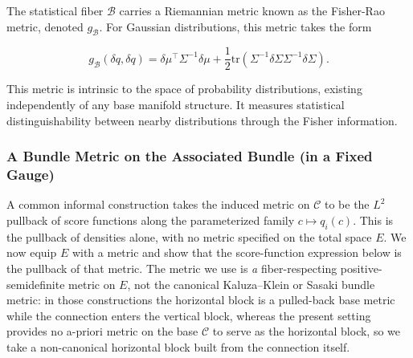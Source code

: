 \documentclass[11pt]{article}
\begin{document}
The statistical fiber $\mathcal{B}$ carries a Riemannian metric known as the Fisher-Rao metric, denoted $g_{\mathcal{B}}$. For Gaussian distributions, this metric takes the form

\begin{equation}
g_{\mathcal{B}}(\delta q, \delta q) = \delta\mu^\top \Sigma^{-1} \delta\mu + \frac{1}{2}\mathrm{tr}(\Sigma^{-1}\delta\Sigma\Sigma^{-1}\delta\Sigma).
\end{equation}

This metric is intrinsic to the space of probability distributions, existing independently of any base manifold structure. It measures statistical distinguishability between nearby distributions through the Fisher information.

\subsubsection{A Bundle Metric on the Associated Bundle (in a Fixed Gauge)}

A common informal construction takes the induced metric on $\mathcal{C}$ to be the $L^2$ pullback of score functions along the parameterized family $c \mapsto q_i(c)$. This is the pullback of densities alone, with no metric specified on the total space $E$. We now equip $E$ with a metric and show that the score-function expression below is the pullback of that metric. The metric we use is \emph{a} fiber-respecting positive-semidefinite metric on $E$, not the canonical Kaluza--Klein or Sasaki bundle metric: in those constructions the horizontal block is a pulled-back base metric while the connection enters the vertical block, whereas the present setting provides no a-priori metric on the base $\mathcal{C}$ to serve as the horizontal block, so we take a non-canonical horizontal block built from the connection itself.
\end{document}
